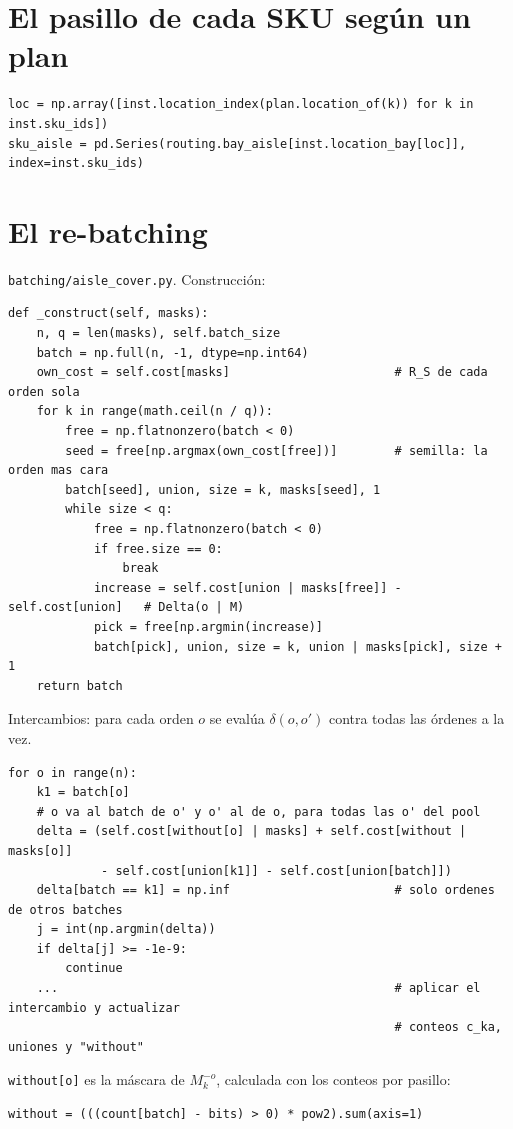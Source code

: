 \documentclass[11pt,a4paper,oneside]{report}
\newcommand{\code}[1]{\texttt{\small #1}}
\begin{document}
\section{El pasillo de cada SKU según un plan}
\begin{lstlisting}
loc = np.array([inst.location_index(plan.location_of(k)) for k in inst.sku_ids])
sku_aisle = pd.Series(routing.bay_aisle[inst.location_bay[loc]], index=inst.sku_ids)
\end{lstlisting}

\section{El re-batching}
\code{batching/aisle\_cover.py}. Construcción:
\begin{lstlisting}
def _construct(self, masks):
    n, q = len(masks), self.batch_size
    batch = np.full(n, -1, dtype=np.int64)
    own_cost = self.cost[masks]                       # R_S de cada orden sola
    for k in range(math.ceil(n / q)):
        free = np.flatnonzero(batch < 0)
        seed = free[np.argmax(own_cost[free])]        # semilla: la orden mas cara
        batch[seed], union, size = k, masks[seed], 1
        while size < q:
            free = np.flatnonzero(batch < 0)
            if free.size == 0:
                break
            increase = self.cost[union | masks[free]] - self.cost[union]   # Delta(o | M)
            pick = free[np.argmin(increase)]
            batch[pick], union, size = k, union | masks[pick], size + 1
    return batch
\end{lstlisting}
Intercambios: para cada orden $o$ se evalúa $\delta(o, o')$ contra todas las órdenes a la vez.
\begin{lstlisting}
for o in range(n):
    k1 = batch[o]
    # o va al batch de o' y o' al de o, para todas las o' del pool
    delta = (self.cost[without[o] | masks] + self.cost[without | masks[o]]
             - self.cost[union[k1]] - self.cost[union[batch]])
    delta[batch == k1] = np.inf                       # solo ordenes de otros batches
    j = int(np.argmin(delta))
    if delta[j] >= -1e-9:
        continue
    ...                                               # aplicar el intercambio y actualizar
                                                      # conteos c_ka, uniones y "without"
\end{lstlisting}
\code{without[o]} es la máscara de $M_k^{-o}$, calculada con los conteos por pasillo:
\begin{lstlisting}
without = (((count[batch] - bits) > 0) * pow2).sum(axis=1)
\end{lstlisting}
\end{document}
